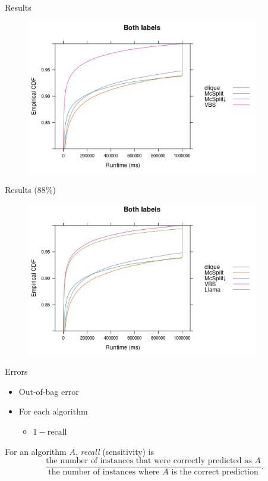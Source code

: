 \documentclass{beamer}
\begin{document}
\begin{frame}{Results}
  \begin{figure}
    \centering
    \includegraphics[width=0.9\textwidth]{../dissertation/images/ecdf_both_labels.png}
  \end{figure}
\end{frame}

\begin{frame}{Results (88\%)}
  \begin{figure}
    \centering
    \includegraphics[width=0.9\textwidth]{../dissertation/images/ecdf_both_labels_llama.png}
  \end{figure}
\end{frame}

\begin{frame}{Errors}
  \begin{itemize}
  \item Out-of-bag error
  \item For each algorithm
    \begin{itemize}
    \item $1 - \text{recall}$
    \end{itemize}
  \end{itemize}
  \begin{definition}
    For an algorithm $A$, \emph{recall} (sensitivity) is
    \[ \frac{\text{the number of instances that were correctly predicted as
          $A$}}{\text{the number of instances where $A$ is the correct
          prediction}}. \]
  \end{definition}
\end{frame}
\end{document}
